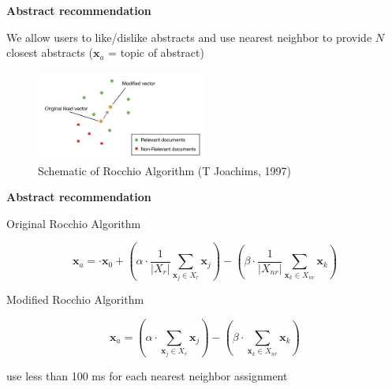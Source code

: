 \begin{frame}{\textbf{Abstract recommendation}}

We allow users to like/dislike abstracts and use nearest neighbor to provide $N$ closest abstracts ($\mathbf{x}_a$ = topic of abstract)

\begin{figure}
\includegraphics[width=2.2in]{images/rocchio}\\
\tiny{Schematic of Rocchio Algorithm (T Joachims, 1997)}
\end{figure}

\end{frame}


\begin{frame}{\textbf{Abstract recommendation}}

Original Rocchio Algorithm

\begin{equation*}
\mathbf{x}_a = \cdot \mathbf{x}_0 + (\alpha \cdot \frac{1}{\left| X_r \right|} \sum_{\mathbf{x}_j \in X_r} \mathbf{x}_j) - (\beta \cdot \frac{1}{\left| X_{nr} \right|} \sum_{\mathbf{x}_k \in X_{nr}} \mathbf{x}_k)
\end{equation*}

Modified Rocchio Algorithm

\begin{equation*}
\mathbf{x}_a = (\alpha \cdot \sum_{\mathbf{x}_j \in X_r} \mathbf{x}_j) - (\beta \cdot \sum_{\mathbf{x}_k \in X_{nr}} \mathbf{x}_k)
\end{equation*}

use less than 100 ms for each nearest neighbor assignment

\end{frame}